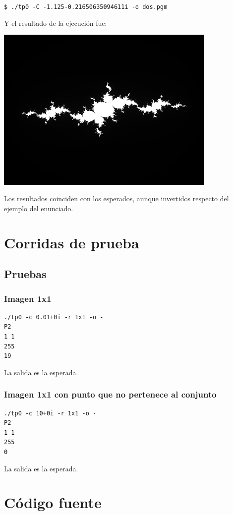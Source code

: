 \bigskip
\texttt{\$  ./tp0 -C -1.125-0.21650635094611i -o dos.pgm}

\bigskip
Y el resultado de la ejecución fue:

\bigskip
\includegraphics[width=0.8\textwidth,natwidth=610,natheight=642]{dos.png}

\bigskip
Los resultados coinciden con los esperados, aunque invertidos respecto del ejemplo del enunciado.

\section{Corridas de prueba}

\subsection{Pruebas}

\subsubsection{Imagen 1x1}
\begin{verbatim}
./tp0 -c 0.01+0i -r 1x1 -o -
P2 
1 1 
255 
19 
\end{verbatim}
La salida es la esperada.

\subsubsection{Imagen 1x1 con punto que no pertenece al conjunto}
\begin{verbatim}
./tp0 -c 10+0i -r 1x1 -o -
P2 
1 1 
255 
0
\end{verbatim}
La salida es la esperada.

\section{Código fuente}

